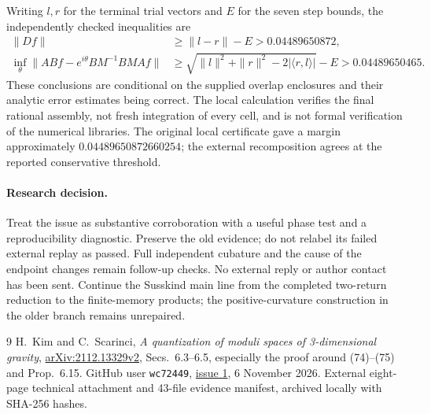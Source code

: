 \documentclass[11pt,a4paper]{article}
\begin{document}
Writing $l,r$ for the terminal trial vectors and $E$ for the seven
step bounds, the independently checked inequalities are
\begin{align}
 \|Df\|&\geq\|l-r\|-E>0.04489650872,\\
 \inf_\theta\|ABf-e^{i\theta}BM^{-1}BMAf\|
 &\geq\sqrt{\|l\|^2+\|r\|^2-2|\langle r,l\rangle|}-E
 >0.04489650465.
\end{align}
These conclusions are conditional on the supplied overlap enclosures
and their analytic error estimates being correct. The local calculation
verifies the final rational assembly, not fresh integration of every
cell, and is not formal verification of the numerical libraries.
The original local certificate gave a margin approximately
$0.04489650872660254$; the external recomposition agrees at the
reported conservative threshold.

\paragraph{Research decision.}
Treat the issue as substantive corroboration with a useful phase
test and a reproducibility diagnostic. Preserve the old evidence;
do not relabel its failed external replay as passed. Full independent
cubature and the cause of the endpoint changes remain follow-up
checks. No external reply or author contact has been sent. Continue
the Susskind main line from the completed two-return reduction to
the finite-memory products; the positive-curvature construction in
the older branch remains unrepaired.

\begin{thebibliography}{9}
 H.~Kim and C.~Scarinci, \emph{A quantization of moduli
spaces of 3-dimensional gravity},
\href{https://arxiv.org/html/2112.13329v2}{arXiv:2112.13329v2},
Secs.~6.3--6.5, especially the proof around (74)--(75) and Prop.~6.15.
 GitHub user \texttt{wc72449},
\href{https://github.com/wkryyds4-netizen/de-sitter-holography/issues/1}{issue 1},
6 November 2026. External eight-page technical attachment and
43-file evidence manifest, archived locally with SHA-256 hashes.
\end{thebibliography}
\end{document}
